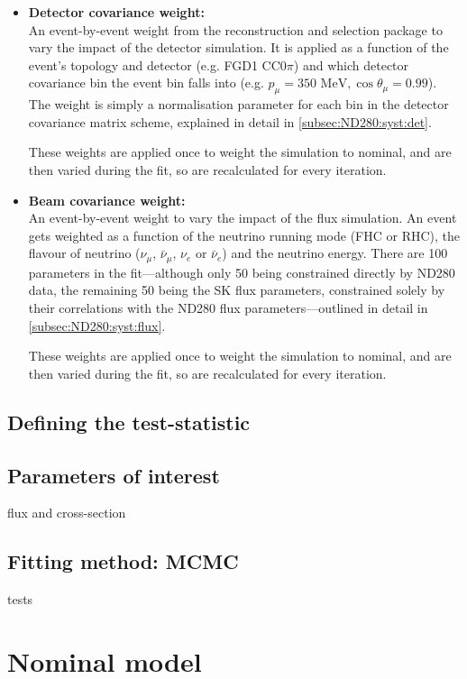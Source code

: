 \begin{itemize}
	\item \textbf{Detector covariance weight:} \\
	An event-by-event weight from the reconstruction and selection package to vary the impact of the detector simulation. It is applied as a function of the event's topology and detector (e.g. FGD1 CC0$\pi$) and which detector covariance bin the event bin falls into (e.g. $p_\mu=350\text{ MeV}, \cos\theta_\mu=0.99$). The weight is simply a normalisation parameter for each bin in the detector covariance matrix scheme, explained in detail in \autoref{subsec:ND280:syst:det}.
	
	These weights are applied once to weight the simulation to nominal, and are then varied during the fit, so are recalculated for every iteration.
	
	\item \textbf{Beam covariance weight:} \\
	An event-by-event weight to vary the impact of the flux simulation. An event gets weighted as a function of the neutrino running mode (FHC or RHC), the flavour of neutrino ($\nu_\mu$, $\bar{\nu}_\mu$, $\nu_e$ or $\bar{\nu}_e$) and the neutrino energy. There are 100 parameters in the fit---although only 50 being constrained directly by ND280 data, the remaining 50 being the SK flux parameters, constrained solely by their correlations with the ND280 flux parameters---outlined in detail in \autoref{subsec:ND280:syst:flux}.
	
	These weights are applied once to weight the simulation to nominal, and are then varied during the fit, so are recalculated for every iteration.
\end{itemize}


\subsection{Defining the test-statistic}


\subsection{Parameters of interest}
flux and cross-section

\subsection{Fitting method: MCMC}
tests

\section{Nominal model}

